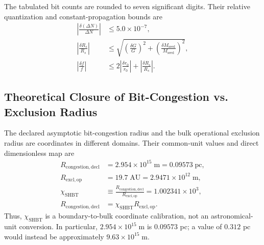\documentclass[10pt,twocolumn]{IEEEtran}
\begin{document}
The tabulated bit counts are rounded to seven significant digits. Their relative quantization and constant-propagation bounds are
\begin{equation}
\begin{aligned}
\left|\frac{\delta(\Delta N)}{\Delta N}\right|
&\leq 5.0\times10^{-7}, \\
\left|\frac{\delta R_s}{R_s}\right|
&\leq
\sqrt{\left(\frac{\delta G}{G}\right)^2
+\left(\frac{\delta M_{\mathrm{seed}}}{M_{\mathrm{seed}}}\right)^2}, \\
\left|\frac{\delta f}{f}\right|
&\leq 2\left|\frac{\delta r_0}{r_0}\right|
+\left|\frac{\delta R_s}{R_s}\right|.
\end{aligned}
\label{eq:section2_uncertainty}
\end{equation}

\subsection{Theoretical Closure of Bit-Congestion vs. Exclusion Radius}
\label{sec:scale_resolution}

The declared asymptotic bit-congestion radius and the bulk operational
exclusion radius are coordinates in different domains.  Their common-unit
values and direct dimensionless map are
\begin{equation}
\begin{aligned}
R_{\mathrm{congestion,decl}}
&=2.954\times10^{15}\;\mathrm{m}
=0.09573\;\mathrm{pc}, \\
R_{\mathrm{excl,op}}
&=19.7\;\mathrm{AU}
=2.9471\times10^{12}\;\mathrm{m}, \\
\chi_{\mathrm{SHBT}}
&\equiv\frac{R_{\mathrm{congestion,decl}}}
{R_{\mathrm{excl,op}}}
=1.002341\times10^3, \\
R_{\mathrm{congestion,decl}}
&=\chi_{\mathrm{SHBT}}R_{\mathrm{excl,op}}.
\end{aligned}
\label{eq:holographic_scale_factor}
\end{equation}
Thus, $\chi_{\mathrm{SHBT}}$ is a boundary-to-bulk coordinate calibration,
not an astronomical-unit conversion.  In particular,
$2.954\times10^{15}\;\mathrm{m}$ is $0.09573$ pc; a value of $0.312$ pc
would instead be approximately $9.63\times10^{15}\;\mathrm{m}$.
\end{document}

